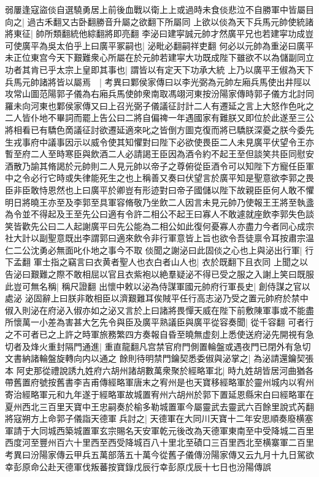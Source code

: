 弱屢逢寇盜倓自選驍勇居上前後血戰以衛上上或過時未食倓悲泣不自勝軍中皆屬目向之|{
	過古禾翻又古卧翻勝音升屬之欲翻下所屬同}
上欲以倓為天下兵馬元帥使統諸將東征|{
	帥所類翻統他綜翻將即亮翻}
李泌曰建寜誠元帥才然廣平兄也若建寜功成豈可使廣平為吳太伯乎上曰廣平冢嗣也|{
	泌毗必翻嗣祥吏翻}
何必以元帥為重泌曰廣平未正位東宫今天下艱難衆心所屬在於元帥若建寜大功既成陛下雖欲不以為儲副同立功者其肯已乎太宗上皇即其事也|{
	謂皆以有定天下功承大統}
上乃以廣平王俶為天下兵馬元帥諸將皆以屬焉　|{
	考異曰鄴侯家傳曰以李光弼為元帥左廂兵馬使出井陘以攻常山圖范陽郭子儀為右廂兵馬使帥衆南取馮翊河東按汾陽家傳時郭子儀方北討同羅未向河東也鄴侯家傳又曰上召光弼子儀議征討計二人有遷延之言上大怒作色叱之二人皆仆地不畢詞而罷上告公曰二將自偏禆一年遇國家有難朕又即位於此遂至三公將相看已有驕色啇議征討欲遷延適來叱之皆倒方圖克復而將已驕朕深憂之朕今委先生戎事府中議事因示以威令使其知懼對曰陛下必欲使畏臣二人未見廣平伏望令王亦暫至府二人至時寒臣與飲酒二人必請謁王臣因為酒令約不起王至但談笑共臣同慰安酒散乃諭其脩謁於元帥則二人見元帥以帝子之尊俯從臣酒令可以知陛下方寵任臣軍中之令必行它時或失律能死生之也上稱善又奏曰伏望言於廣平知是聖意欲李郭之畏臣非臣敢恃恩然也上曰廣平於卿豈有形迹對曰帝子國儲以陛下故親臣臣何人敢不懼明日將曉王亦至及李郭至具軍容脩敬乃坐飲二人因言未見元帥乃使報王王將至執盞為令並不得起及王至先公曰適有令許二相公不起王曰寡人不敢遽就座飲李郭失色談笑皆歡先公曰二人起謝廣平曰先公能為二相公如此復何憂寡人亦盡力今者同心成宗社大計以副聖意既出李謂郭曰適來飲令非行軍意皆上旨也欲令吾徒禀令耳按肅宗温仁二公沈勇必無面叱仆地之事今不取}
倓聞之謝泌曰此固倓之心也上與泌出行軍|{
	行下孟翻}
軍士指之竊言曰衣黄者聖人也衣白者山人也|{
	衣於既翻下且衣同}
上聞之以告泌曰艱難之際不敢相屈以官且衣紫袍以絶羣疑泌不得已受之服之入謝上笑曰既服此豈可無名稱|{
	稱尺證翻}
出懷中敕以泌為侍謀軍國元帥府行軍長史|{
	創侍謀之官以處泌}
泌固辭上曰朕非敢相臣以濟艱難耳俟賊平任行高志泌乃受之置元帥府於禁中俶入則泌在府泌入俶亦如之泌又言於上曰諸將畏憚天威在陛下前敷陳軍事或不能盡所懷萬一小差為害甚大乞先令與臣及廣平熟議臣與廣平從容奏聞|{
	從千容翻}
可者行之不可者已之上許之時軍旅務繁四方奏報自昏至曉無虚刻上悉使送府泌先開視有急切者及烽火重封隔門通進|{
	重直龍翻凡宫禁官府門側置輪盤或遇夜門已閉外有急切文書納諸輪盤旋轉向内以通之}
餘則待明禁門鑰契悉委俶與泌掌之|{
	為泌請還鑰契張本}
阿史那從禮說誘九姓府六胡州諸胡數萬衆聚於經略軍北|{
	時九姓胡皆居河曲猶各帶舊置府號按舊書李吉甫傳經略軍唐末之宥州是也天寶移經略軍於靈州城内以宥州寄治經略軍元和九年遂于經略軍故城置宥州六胡州於郭下置延恩縣宋白曰經略軍在夏州西北三百里天寶中王忠嗣奏於榆多勒城置軍今屬靈武去靈武六百餘里說式芮翻}
將寇朔方上命郭子儀詣天德軍兵討之|{
	天德軍在大同川天寶十二年安思順奏廢横塞軍請于大同城西築城置軍玄宗賜名天安軍乾元後改為天德軍東南至中受降城二百里西度河至豐州百六十里西至西受降城百八十里北至磧口三百里西北至横寨軍二百里　考異曰汾陽家傳云甲兵五萬部落五十萬今從舊子儀傳汾陽家傳又云九月十九日駕欲幸彭原命公赴天德軍伐叛蕃按寶錄戊辰行幸彭原戊辰十七日也汾陽傳誤}
